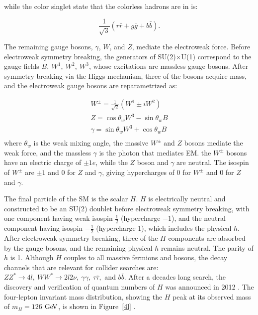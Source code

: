 while the color singlet state that the colorless hadrons are in is:

\begin{equation}
\frac{1}{\sqrt{3}}(r\bar{r} + g\bar{g} + b\bar{b}).
\end{equation}

\indent The remaining gauge bosons, $\gamma$, $W$, and $Z$, mediate the electroweak force. Before electroweak symmetry breaking, the generators of SU(2)$\times$U(1) correspond to the gauge fields $B,\  W^1,\  W^2,\  W^3$, whose excitations are massless gauge bosons. After symmetry breaking via the Higgs mechanism, three of the bosons acquire mass, and the electroweak gauge bosons are reparametrized as:

\begin{equation}
\begin{split}
W^\pm = \frac{1}{\sqrt{2}}(W^1 \pm iW^2) \\
Z = \cos\theta_w W^3 - \sin\theta_w B \\
\gamma = \sin\theta_w W^3 + \cos\theta_w B \\
\end{split}
\end{equation}
where $\theta_w$ is the weak mixing angle, the massive $W^\pm$ and $Z$ bosons mediate the weak force, and the massless $\gamma$ is the photon that mediates EM. the $W^\pm$ bosons have an electric charge of $\pm 1e$, while the $Z$ boson and $\gamma$ are neutral. The isospin of $W^\pm$ are $\pm1$ and 0 for $Z$ and $\gamma$, giving hypercharges of $0$ for $W^\pm$ and 0 for $Z$ and $\gamma$. 

\indent The final particle of the SM is the scalar $H$. $H$ is electrically neutral and constructed to be an SU(2) doublet before electroweak symmetry breaking, with one component having weak isospin $\frac{1}{2}$ (hypercharge $-1$), and the neutral component having isospin $-\frac{1}{2}$ (hypercharge 1), which includes the physical $h$. After electroweak symmetry breaking, three of the $H$ components are absorbed by the gauge bosons, and the remaining physical $h$ remains neutral. The parity of $h$ is 1. Although $H$ couples to all massive fermions and bosons, the decay channels that are relevant for collider searches are: $ZZ^* \rightarrow 4l,\  WW^* \rightarrow 2l2\nu,\  \gamma\gamma,\  \tau\bar{\tau},$ and $b\bar{b}$. After a decades long search, the discovery and verification of quantum numbers of $H$ was announced in 2012 \cite{Chatrchyan:2012xdj, Aad:2012tfa}. The four-lepton invariant mass distribution, showing the $H$ peak at its observed mass of $m_H = 126$ $\mathrm{Ge\kern -0.1em V}$, is shown in Figure~\ref{4l} \cite{CMS:HZZ}.

